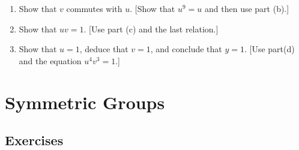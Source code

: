 \documentclass[10pt,a4paper]{report}
\begin{document}
\begin{enumerate}
\begin{enumerate}
	\item Show that $v$ commutes with $u$.  [Show that $u^9=u$ and then use part (b).]
	
	\item Show that $uv=1$.  [Use part (c) and the last relation.]
	
	\item Show that $u=1$, deduce that $v=1$, and conclude that $y=1$.  [Use part(d) and the equation $u^4v^3=1$.]
\end{enumerate}

\end{enumerate}

\section{Symmetric Groups}

\subsection{Exercises}
\end{document}
